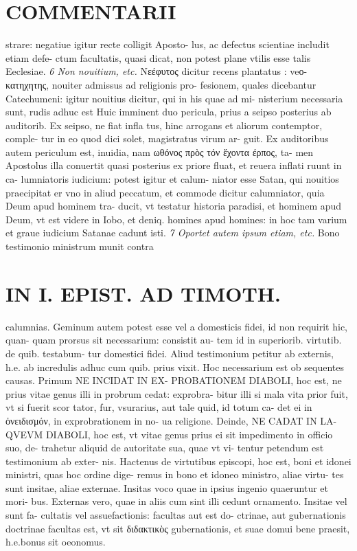 \documentclass{article}
\begin{document}
\begin{pages}
\section*{COMMENTARII }\pstart strare: negatiue igitur recte colligit Aposto- lus, ac defectus scientiae includit etiam defe- ctum facultatis, quasi dicat, non potest plane vtilis esse talis Eeclesiae.  \pend
\textit{6 Non nouitium, etc. }\pstart Νεέφυτος dicitur recens plantatus : veο- κατηχητης, nouiter admissus ad religionis pro- fesionem, quales dicebantur Catechumeni: igitur nouitius dicitur, qui in his quae ad mi- nisterium necessaria sunt, rudis adhuc est Huic imminent duo pericula, prius a seipso posterius ab auditorib. Ex seipso, ne fiat infla tus, hinc arrogans et aliorum contemptor, comple- tur in eo quod dici solet, magistratus virum ar- guit. Ex auditoribus autem periculum est, inuidia, nam ωθόνος πρὸς τόν ἔχοντα έρπος, ta- men Apostolus illa conuertit quasi posterius ex priore fluat, et reuera inflati ruunt in ca- lumniatoris iudicium: potest igitur et calum- niator esse Satan, qui nouitios praecipitat er vno in aliud peccatum, et commode dicitur calumniator, quia Deum apud hominem tra- ducit, vt testatur historia paradisi, et hominem apud Deum, vt est videre in Iobo, et deniq. homines apud homines: in hoc tam varium et graue iudicium Satanae cadunt isti.  \pend
\textit{7 Oportet autem ipsum etiam, etc. }\pstart Bono testimonio ministrum munit contra  \pend
\section*{IN I. EPIST. AD TIMOTH. }
\marginpar{[ p.69 ]}\pstart calumnias. Geminum autem potest esse vel a domesticis fidei, id non requirit hic, quan- quam prorsus sit necessarium: consistit au- tem id in superiorib. virtutib. de quib. testabum- tur domestici fidei. Aliud testimonium petitur ab externis, h.e. ab incredulis adhuc cum quib. prius vixit. Hoc necessarium est ob sequentes causas. Primum NE INCIDAT IN EX- PROBATIONEM DIABOLI, hoc est, ne prius vitae genus illi in probrum cedat: exprobra- bitur illi si mala vita prior fuit, vt si fuerit scor tator, fur, vsurarius, aut tale quid, id totum ca- det ei in ὀνειδισμόν, in exprobrationem in no- ua religione. Deinde, NE CADAT IN LA- QVEVM DIABOLI, hoc est, vt vitae genus prius ei sit impedimento in officio suo, de- trahetur aliquid de autoritate sua, quae vt vi- tentur petendum est testimonium ab exter- nis. Hactenus de virtutibus episcopi, hoc est, boni et idonei ministri, quas hoc ordine dige- remus in bono et idoneo ministro, aliae virtu- tes sunt insitae, aliae externae. Insitas voco quae in ipsius ingenio quaeruntur et mori- bus. Externas vero, quae in aliis cum sint illi cedunt ornamento. Insitae vel sunt fa- cultatis vel assuefactionis: facultas aut est do- ctrinae, aut gubernationis doctrinae facultas est, vt sit διδακτικὸς gubernationis, et suae domui bene praesit, h.e.bonus sit oeonomus.  \pend
\marginpar{[ p.70 ]}

\end{pages}
\end{document}
